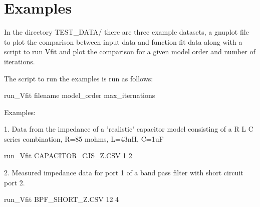 \section{Examples} \label{examples}

In the directory TEST\_DATA/ there are three example datasets, a gnuplot file to plot the comparison between input data and function fit data along with a script to run Vfit and plot the comparison for a given model order and number of iterations.

The script to run the examples is run as follows:

run\_Vfit filename model\_order max\_iternations

Examples:

1. Data from the impedance of a 'realistic' capacitor model consisting of a 
R L C series combination, R=85 mohms, L=43nH, C=1uF

run\_Vfit CAPACITOR\_CJS\_Z.CSV 1 2

2. Measured impedance data for port 1 of a band pass filter with short circuit port 2.

run\_Vfit BPF\_SHORT\_Z.CSV 12 4 
